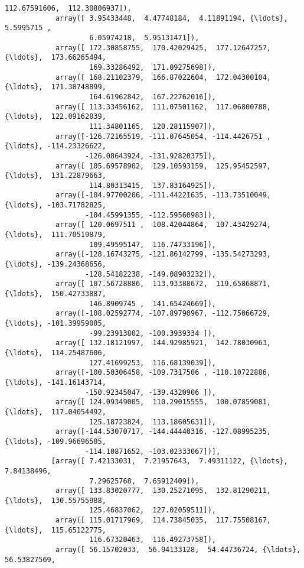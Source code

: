 \documentclass[11pt]{article}
\begin{document}
\begin{Verbatim}[commandchars=\\\{\}]
                    112.67591606,  112.30806937]),
            array([ 3.95433448,  4.47748184,  4.11891194, {\ldots},  5.5995715 ,
                    6.05974218,  5.95131471]),
            array([ 172.30858755,  170.42029425,  177.12647257, {\ldots},  173.66265494,
                    169.33286492,  171.09275698]),
            array([ 168.21102379,  166.87022604,  172.04300104, {\ldots},  171.38748899,
                    164.61962842,  167.22762016]),
            array([ 113.33456162,  111.07501162,  117.06800788, {\ldots},  122.09162839,
                    111.34801165,  120.28115907]),
            array([-126.72165519, -111.07645054, -114.4426751 , {\ldots}, -114.23326622,
                   -126.08643924, -131.92820375]),
            array([ 105.69578902,  129.10593159,  125.95452597, {\ldots},  131.22879663,
                    114.80313415,  137.83164925]),
            array([-104.97700206, -111.44221635, -113.73510049, {\ldots}, -103.71782825,
                   -104.45991355, -112.59560983]),
            array([ 120.0697511 ,  108.42044864,  107.43429274, {\ldots},  111.70519879,
                    109.49595147,  116.74733196]),
            array([-128.16743275, -121.86142799, -135.54273293, {\ldots}, -139.24368656,
                   -128.54182238, -149.08903232]),
            array([ 107.56728886,  113.93388672,  119.65868871, {\ldots},  150.42733887,
                    146.8909745 ,  141.65424669]),
            array([-108.02592774, -107.89790967, -112.75066729, {\ldots}, -101.39959005,
                    -99.23913802, -100.3939334 ]),
            array([ 132.18121997,  144.92985921,  142.78030963, {\ldots},  114.25487606,
                    127.41699253,  116.68139039]),
            array([-100.50306458, -109.7317506 , -110.10722886, {\ldots}, -141.16143714,
                   -150.92345047, -139.4320906 ]),
            array([ 124.09349005,  110.29015555,  100.07859081, {\ldots},  117.04054492,
                    125.18723824,  113.18605631]),
            array([-144.53070717, -144.44440316, -127.08995235, {\ldots}, -109.96696505,
                   -114.10871652, -103.02333067])],
           [array([ 7.42133031,  7.21957643,  7.49311122, {\ldots},  7.84138496,
                    7.29625768,  7.65912409]),
            array([ 133.83020777,  130.25271095,  132.81290211, {\ldots},  130.55755988,
                    125.46837062,  127.02059511]),
            array([ 115.01717969,  114.73845035,  117.75508167, {\ldots},  115.65122775,
                    116.67320463,  116.49273758]),
            array([ 56.15702033,  56.94133128,  54.44736724, {\ldots},  56.53827569,

\end{Verbatim}
\end{document}
